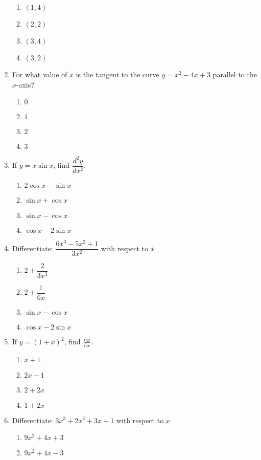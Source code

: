 \begin{multicols}{2}
\begin{enumerate}[label={\arabic*.}]
\begin{enumerate}[label={\Alph*.}]
	\item \((1, 4)\)
	\item \((2, 2)\)
	\item \((3, 4)\)
	\item \((3, 2)\)
\end{enumerate}  
\item For what value of \(x\) is the tangent to the curve \(y = x^{2} - 4x + 3\) parallel to the \(x\)-axis?
\begin{enumerate}[label={\Alph*.}]
	\item \(0\)
	\item \(1\)
	\item \(2\)
	\item \(3\)
\end{enumerate}   
\item If \(y = x \sin x\), find \( \dfrac{d^2y}{d{x}^{2}} \).
	\begin{enumerate}[label={\Alph*.}]
		\item \(2\cos x - \sin x\)
		\item \(\sin x + \cos x\)
		\item \(\sin x  - \cos  x\)
		\item \( \cos x  - 2\sin x \)
	\end{enumerate}
\item Differentiate: \(\dfrac{6x^{3} - 5x^{2} + 1}{3x^{2}}\) with respect to \(x\)
	\begin{enumerate}[label={\Alph*.}]
		\item \(2 + \dfrac{2}{3{x}^{3}}\)
		\item \(2 + \dfrac{1}{6x}\)
		\item \(\sin x - \cos x\)
		\item \(\cos x - 2\sin x\)
	\end{enumerate}
\item If \(y = (1+x)^{2}\), find \( \dv{y}{x} \).
	\begin{enumerate}[label={\Alph*.}]
		\item \(x + 1\)
		\item \(2x - 1\)
		\item \(2 + 2x\)
		\item \(1 + 2x\)
	\end{enumerate}
\item Differentiate: \(3{x}^{3}+2{x}^{2}+3x+1\) with respect to \(x\)
\begin{enumerate}[label={\Alph*.}]
		\item \(9{x}^{2} + 4x + 3\)
		\item \(9{x}^{2} + 4x - 3\)

\end{enumerate}
\end{enumerate}
\end{multicols}
